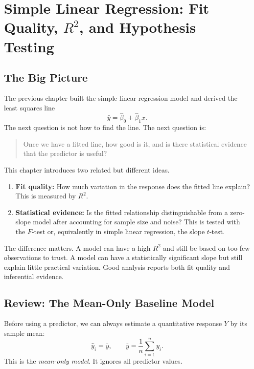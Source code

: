 \chapter{Simple Linear Regression: Fit Quality, \texorpdfstring{$R^2$}{R-squared}, and Hypothesis Testing}
\label{chap:slr-fit-quality-r2-hypothesis-testing}

\section{The Big Picture}

The previous chapter built the simple linear regression model and derived the least squares line
\begin{equation}
  \widehat{y}=\widehat{\beta}_0+\widehat{\beta}_1x.
\end{equation}
The next question is not how to find the line.  The next question is:
\begin{quote}
  Once we have a fitted line, how good is it, and is there statistical evidence that the predictor is useful?
\end{quote}

This chapter introduces two related but different ideas.
\begin{enumerate}
  \item \textbf{Fit quality:} How much variation in the response does the fitted line explain?  This is measured by $R^2$.
  \item \textbf{Statistical evidence:} Is the fitted relationship distinguishable from a zero-slope model after accounting for sample size and noise?  This is tested with the $F$-test or, equivalently in simple linear regression, the slope $t$-test.
\end{enumerate}

The difference matters.  A model can have a high $R^2$ and still be based on too few observations to trust.  A model can have a statistically significant slope but still explain little practical variation.  Good analysis reports both fit quality and inferential evidence.

\section{Review: The Mean-Only Baseline Model}

Before using a predictor, we can always estimate a quantitative response $Y$ by its sample mean:
\begin{equation}
  \widehat{y}_i=\bar{y},
  \qquad
  \bar{y}=\frac{1}{n}\sum_{i=1}^n y_i.
\end{equation}
This is the \emph{mean-only model}.  It ignores all predictor values.

